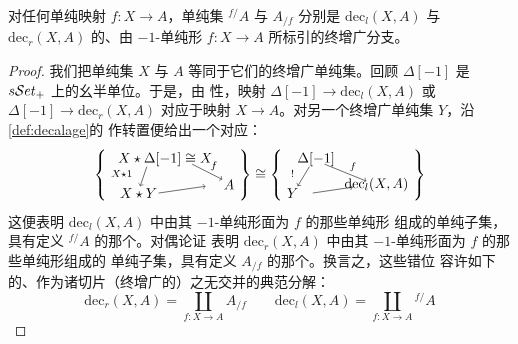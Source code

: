 \begin{lemma}\label{lem:slices-as-components}
对任何单纯映射 $f\colon X\to A$，单纯集 ${}^{f/}\!A$ 与 $A_{/f}$ 分别是%
$\mathrm{dec}_{l}(X,A)$ 与 $\mathrm{dec}_{r}(X,A)$ 的、由 $-1$-单纯形%
$f\colon X\to A$ 所标引的终增广分支。
\end{lemma}

\begin{proof}
我们把单纯集 $X$ 与 $A$ 等同于它们的终增广单纯集。回顾%
$\Delta[-1]$ 是 $s\mathcal{S}et_{+}$ 上\trJoin\trBifunctor{}的幺半单位。于是，由%
\trAdjunction{}性，映射%
$\Delta[-1]\to\mathrm{dec}_{l}(X,A)$ 或 $\Delta[-1]\to\mathrm{dec}_{r}(X,A)$%
对应于映射 $X\to A$。对另一个终增广单纯集 $Y$，沿\cref{def:decalage}的%
\trAdjunction{}作转置便给出一个对应：
\begin{equation*}
\left\{\vcenter{\hbox{\begin{tikzpicture}[x=1.2em,y=1.2em]
  \node (t) at (1.6,1.0) {$X\star\Delta[-1]\cong X$};
  \node (a) at (5.4,-0.5) {$A$};
  \node (xy) at (0,-1.0) {$X\star Y$};
  \draw[->] (3.2,0.7) -- (5.0,-0.2);
  \node at (4.5,0.6) {$\scriptstyle f$};
  \draw[->] (0.5,0.55) -- (0.1,-0.6);
  \node at (-1.0,0.15) {$\scriptstyle X\star 1$};
  \draw[->] (1.2,-1.0) -- (4.0,-0.6);
\end{tikzpicture}}}\right\}
\cong
\left\{\vcenter{\hbox{\begin{tikzpicture}[x=1.2em,y=1.2em]
  \node (t) at (1.4,1.0) {$\Delta[-1]$};
  \node (y) at (0,-1.0) {$Y$};
  \node (d) at (5.0,-0.5) {$\mathrm{dec}_{l}(X,A)$};
  \draw[->] (1.0,0.55) -- (0.3,-0.6);
  \node at (0.0,0.15) {$\scriptstyle !$};
  \draw[->] (1.9,0.7) -- (4.4,-0.3);
  \node at (3.6,0.55) {$\scriptstyle f$};
  \draw[->] (1.2,-1.0) -- (3.6,-0.65);
\end{tikzpicture}}}\right\}
\end{equation*}
这便表明 $\mathrm{dec}_{l}(X,A)$ 中由其 $-1$-单纯形面为 $f$ 的那些单纯形%
组成的单纯子集，具有定义 ${}^{f/}\!A$ 的那个\trUniversalProperty。对偶论证%
表明 $\mathrm{dec}_{r}(X,A)$ 中由其 $-1$-单纯形面为 $f$ 的那些单纯形组成的%
单纯子集，具有定义 $A_{/f}$ 的那个\trUniversalProperty。换言之，这些错位%
容许如下的、作为诸切片（终增广的）之无交并的典范分解：
\begin{equation*}
\mathrm{dec}_{r}(X,A)=\coprod_{f\colon X\to A}A_{/f}
\qquad
\mathrm{dec}_{l}(X,A)=\coprod_{f\colon X\to A}{}^{f/}\!A
\end{equation*}
\end{proof}

